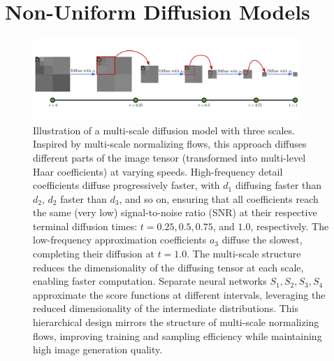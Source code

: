 \section{Non-Uniform Diffusion Models}

\begin{figure}[h]
    \centering
    \includegraphics[width=0.9\textwidth]{Outline/figures/non-uniform-diffusion-models/drawing.png}
    \caption{Illustration of a multi-scale diffusion model with three scales. Inspired by multi-scale normalizing flows, this approach diffuses different parts of the image tensor (transformed into multi-level Haar coefficients) at varying speeds. High-frequency detail coefficients diffuse progressively faster, with $d_1$ diffusing faster than $d_2$, $d_2$ faster than $d_3$, and so on, ensuring that all coefficients reach the same (very low) signal-to-noise ratio (SNR) at their respective terminal diffusion times: $t = 0.25, 0.5, 0.75$, and $1.0$, respectively. The low-frequency approximation coefficients $a_3$ diffuse the slowest, completing their diffusion at $t = 1.0$. The multi-scale structure reduces the dimensionality of the diffusing tensor at each scale, enabling faster computation. Separate neural networks $S_1, S_2, S_3, S_4$ approximate the score functions at different intervals, leveraging the reduced dimensionality of the intermediate distributions. This hierarchical design mirrors the structure of multi-scale normalizing flows, improving training and sampling efficiency while maintaining high image generation quality.}
    \label{fig:Multiscale model}
\end{figure}

